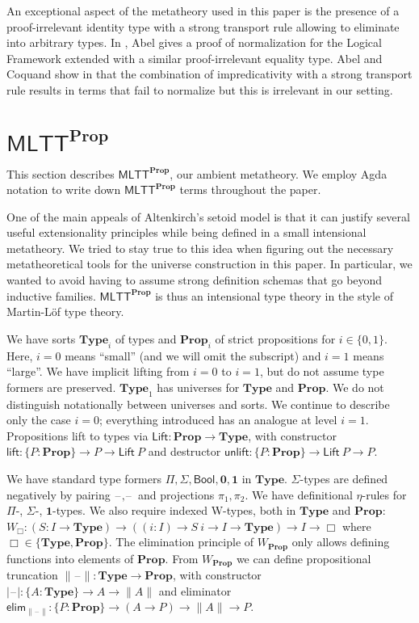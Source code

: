 \documentclass[autoref]{llncs}
\newcommand{\mlttp}{\textsf{MLTT}^{\mProp}}
\newcommand{\mType}{\mathbf{Type}}
\newcommand{\mProp}{\mathbf{Prop}}
\newcommand{\Type}{\mathbf{Type}}
\newcommand{\blank}{\mathord{\hspace{1pt}\text{--}\hspace{1pt}}}
\begin{document}
An exceptional aspect of the metatheory used in this paper is the presence of a
proof-irrelevant identity type with a strong transport rule allowing to
eliminate into arbitrary types.
%
In \cite{abel:nbe09}, Abel gives a proof of normalization for the
Logical Framework extended with a similar proof-irrelevant equality type.
%
Abel and Coquand show in \cite{abel2019failure} that the combination of
impredicativity with a strong transport rule results in terms that fail to
normalize but this is irrelevant in our setting.

\section{$\mlttp$}\label{sec:metatheory}

This section describes $\mlttp$, our ambient metatheory. We employ Agda notation
to write down $\mlttp$ terms throughout the paper.

One of the main appeals of Altenkirch's setoid model is that it can justify
several useful extensionality principles while being defined in a small
intensional metatheory.
%
We tried to stay true to this idea when figuring out the necessary
metatheoretical tools for the universe construction in this paper. In
particular, we wanted to avoid having to assume strong definition schemas that
go beyond inductive families.
$\mlttp$ is thus an intensional type theory in the style of Martin-L\"of type theory.

We have sorts $\Type_i$ of types and $\mProp_i$ of strict propositions for $i \in \{0, 1\}$.
Here, $i = 0$ means ``small'' (and we will omit the subscript) and $i = 1$ means ``large''.
We have implicit lifting from $i = 0$ to $i = 1$, but do not assume type formers are preserved.
$\Type_1$ has universes for $\Type$ and $\mProp$.
We do not distinguish notationally between universes and sorts.
We continue to describe only the case $i = 0$; everything introduced has an analogue at level $i = 1$.
Propositions lift to types via $\textsf{Lift} : \mProp \to \mType$, with constructor
$\textsf{lift} : \{P : \mProp \} \to P \to \textsf{Lift}\ P$ and destructor
$\textsf{unlift} : \{P : \mProp \} \to \textsf{Lift}\ P \to P$.

We have standard type formers $\Pi, \Sigma, \textsf{Bool}, \mathbf{0}, \mathbf{1}$ in $\Type$.
$\Sigma$-types are defined negatively by pairing $\blank,\blank$ and projections $\pi_1, \pi_2$.
We have definitional $\eta$-rules for $\Pi$-, $\Sigma$-, $\mathbf{1}$-types.
We also require indexed W-types, both in $\mType$ and $\mProp$:
$W_\Box : (S : I\to\mType) \to ((i:I)\to S\ i\to I \to \mType) \to I\to \Box$ where $\Box \in \{\mType, \mProp\}$.
The elimination principle of $W_{\mProp}$ only allows defining functions into elements of $\mProp$.
%
From $W_{\mProp}$ we can define propositional truncation $\|\blank\| : \mType \to \mProp$, with constructor
  $|\blank| : \{A : \mType \} \to A \to \| A \|$ and eliminator
  $\textsf{elim}_{\|\blank\|} : \{P : \mProp \} \to (A \to P) \to \| A \| \to P$.
\end{document}
